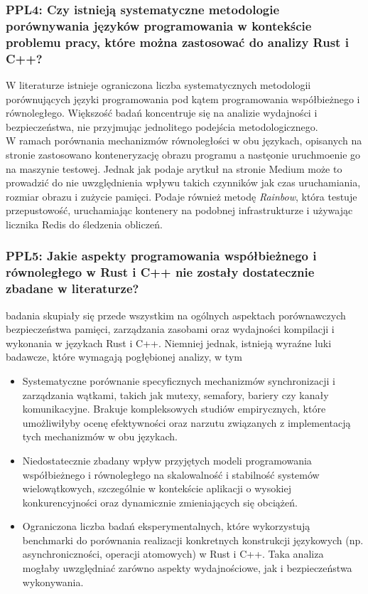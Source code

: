 \subsubsection{PPL4: Czy istnieją systematyczne metodologie porównywania języków programowania w kontekście problemu pracy, które można zastosować do analizy Rust i C++?}
W literaturze istnieje ograniczona liczba systematycznych metodologii porównujących języki programowania pod kątem programowania współbieżnego i równoległego. Większość badań koncentruje się na analizie wydajności i bezpieczeństwa, nie przyjmując jednolitego podejścia metodologicznego.\\
W ramach porównania mechanizmów równoległości w obu językach, opisanych na stronie \cite{parallelrustcppIntroductionComparing} zastosowano konteneryzację obrazu programu a nastęonie uruchmoenie go na maszynie testowej. Jednak jak podaje arytkuł na stronie Medium \cite{rainbow} może to prowadzić do nie uwzględnienia wpływu takich czynników jak czas uruchamiania, rozmiar obrazu i zużycie pamięci. Podaje również metodę \textit{Rainbow}, która testuje przepustowość, uruchamiając kontenery na podobnej infrastrukturze i używając licznika Redis do śledzenia obliczeń.

\subsubsection{PPL5: Jakie aspekty programowania współbieżnego i równoległego w Rust i C++ nie zostały dostatecznie zbadane w literaturze?}
badania skupiały się przede wszystkim na ogólnych aspektach porównawczych bezpieczeństwa pamięci, zarządzania zasobami oraz wydajności kompilacji i wykonania w językach Rust i C++. Niemniej jednak, istnieją wyraźne luki badawcze, które wymagają pogłębionej analizy, w tym
\begin{itemize}
    \item Systematyczne porównanie specyficznych mechanizmów synchronizacji i zarządzania wątkami, takich jak mutexy, semafory, bariery czy kanały komunikacyjne. Brakuje kompleksowych studiów empirycznych, które umożliwiłyby ocenę efektywności oraz narzutu związanych z implementacją tych mechanizmów w obu językach.
    \item Niedostatecznie zbadany wpływ przyjętych modeli programowania współbieżnego i równoległego na skalowalność i stabilność systemów wielowątkowych, szczególnie w kontekście aplikacji o wysokiej konkurencyjności oraz dynamicznie zmieniających się obciążeń.
    \item Ograniczona liczba badań eksperymentalnych, które wykorzystują benchmarki do porównania realizacji konkretnych konstrukcji językowych (np. asynchroniczności, operacji atomowych) w Rust i C++. Taka analiza mogłaby uwzględniać zarówno aspekty wydajnościowe, jak i bezpieczeństwa wykonywania.
\end{itemize}


